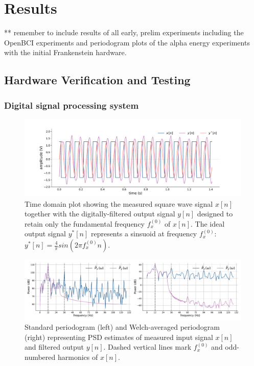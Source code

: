 \chapter{Results}
\label{chapter:results}

\graphicspath{ {report/C6 Results/assets/} } 

** remember to include results of all early, prelim experiments including the OpenBCI experiments and periodogram plots of the alpha energy experiments with the initial Frankenstein hardware.

\section{Hardware Verification and Testing}
\subsection{Digital signal processing system}

\begin{figure}[h]
    \centering
    \includegraphics[width=\textwidth]{sq_wave_filtering_time}
    \caption[Time domain plot showing the measured square wave signal together with the digitally-filtered output signal.]{Time domain plot showing the measured square wave signal $x[n]$ together with the digitally-filtered output signal $y[n]$ designed to retain only the fundamental frequency $f_x^{(0)}$ of $x[n]$. The ideal output signal $y^*[n]$ represents a sinsuoid at frequency $f_x^{(0)}$: $y^*[n] = \frac{4}{\pi}sin(2\pi f_x^{(0)}n)$.}
    \label{fig:sq-wave-time-c6}
\end{figure}

\begin{figure}[h]
    \centering
    \includegraphics[width=\textwidth]{sq_wave_filtering_spectra}
    \caption[PSD estimates of a measured input signal and its filtered output]{Standard periodogram (left) and Welch-averaged periodogram (right) representing PSD estimates of measured input signal $x[n]$ and filtered output $y[n]$. Dashed vertical lines mark $f_x^{(0)}$ and odd-numbered harmonics of $x[n]$.}
    \label{fig:sq-wave-spectra-c6}
\end{figure}

